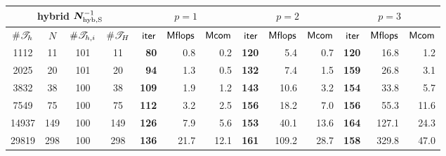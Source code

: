  {\footnotesize
      \tabcolsep 4pt
  \begin{tabular}{cccc|rrr|rrr|rrr}
  \hline
  \multicolumn{4}{c|}{{\small\bf hybrid} $\bm{N}_{\mathrm{hyb,S}}^{-1}$        }  &  \multicolumn{3}{c|}{$p=1$} & \multicolumn{3}{c|}{$p=2$}&   \multicolumn{3}{c}{$p=3$}\\
  \hline
     $ \# {{\mathscr T}_h} $   &
     $ N $ & $ \# {{\mathscr T}_{h,i}} $   &
     $ \# {{\mathscr T}_H} $ & 
     $ \mathsf{iter} $ & $ \mathsf{Mflops} $ & $ \mathsf{Mcom} $ & 
     $ \mathsf{iter} $ & $ \mathsf{Mflops} $ & $ \mathsf{Mcom} $ & 
     $ \mathsf{iter} $ & $ \mathsf{Mflops} $ & $ \mathsf{Mcom} $ \\ 
  \hline
    1112 &       11 &      101 &       11
& {\bf       80}  &        0.8 &        0.2
& {\bf      120}  &        5.4 &        0.7
& {\bf      120}  &       16.8 &        1.2
 \\
    2025 &       20 &      101 &       20
& {\bf       94}  &        1.3 &        0.5
& {\bf      132}  &        7.4 &        1.5
& {\bf      159}  &       26.8 &        3.1
 \\
    3832 &       38 &      100 &       38
& {\bf      109}  &        1.9 &        1.2
& {\bf      143}  &       10.6 &        3.2
& {\bf      154}  &       33.8 &        5.7
 \\
    7549 &       75 &      100 &       75
& {\bf      112}  &        3.2 &        2.5
& {\bf      156}  &       18.2 &        7.0
& {\bf      156}  &       55.3 &       11.6
 \\
   14937 &      149 &      100 &      149
& {\bf      126}  &        7.9 &        5.6
& {\bf      153}  &       40.1 &       13.6
& {\bf      164}  &      127.1 &       24.3
 \\
   29819 &      298 &      100 &      298
& {\bf      136}  &       21.7 &       12.1
& {\bf      161}  &      109.2 &       28.7
& {\bf      158}  &      329.8 &       47.0
 \\
  \hline
  \end{tabular}
 }
